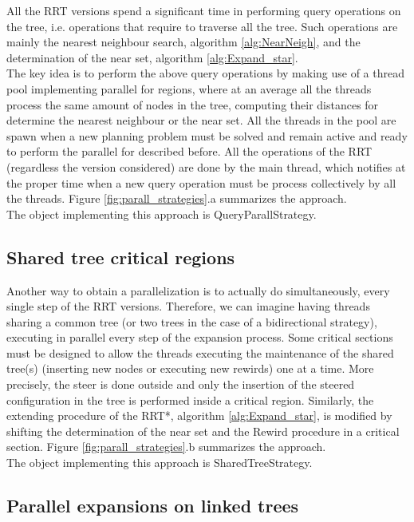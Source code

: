 All the RRT versions spend a significant time in performing query operations on the tree, i.e. operations that require to traverse all the tree.
Such operations are mainly the nearest neighbour search, algorithm \ref{alg:NearNeigh}, and the determination of the near set, algorithm \ref{alg:Expand_star}.
\\
The key idea is to perform the above query operations by making use of a thread pool implementing parallel for regions, where at an average all the threads process the same amount of nodes in the tree, computing their distances for determine the nearest neighbour or the near set. 
All the threads in the pool are spawn when a new planning problem must be solved and remain active and ready to perform the parallel for described before.
All the operations of the RRT (regardless the version considered) are done by the main thread, which notifies at the proper time when a new query operation must be process collectively by all the threads. Figure \ref{fig:parall_strategies}.a summarizes the approach.
\\
The object implementing this approach is QueryParallStrategy.

\subsection{Shared tree critical regions}
\label{sec:strtg_shared}

Another way to obtain a parallelization is to actually do simultaneously, every single step of the RRT versions. Therefore, we can imagine having threads sharing a common tree (or two trees in the case of a bidirectional strategy), executing in parallel every step of the expansion process. Some critical sections must be designed to allow the threads executing the maintenance of the shared tree(s) (inserting new nodes or executing new rewirds) one at a time.
More precisely, the steer is done outside and only the insertion of the steered configuration in the tree is performed inside a critical region.
Similarly, the extending procedure of the RRT*, algorithm \ref{alg:Expand_star}, is modified by shifting the determination of the near set and the Rewird procedure in a critical section. Figure \ref{fig:parall_strategies}.b summarizes the approach.
\\
The object implementing this approach is SharedTreeStrategy.

\subsection{Parallel expansions on linked trees}
\label{sec:strtg_copied}

